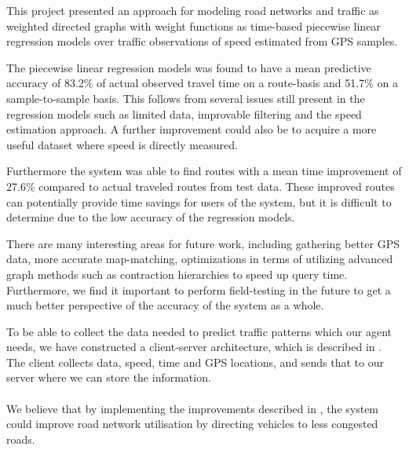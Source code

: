 This project presented an approach for modeling road networks and traffic as weighted directed graphs with weight functions as time-based piecewise linear regression models over traffic observations of speed estimated from GPS samples.

The piecewise linear regression models was found to have a mean predictive accuracy of 83.2\% of actual observed travel time on a route-basis and 51.7\% on a sample-to-sample basis. This follows from several issues still present in the regression models such as limited data, improvable filtering and the speed estimation approach. A further improvement could also be to acquire a more useful dataset where speed is directly measured.

Furthermore the system was able to find routes with a mean time improvement of 27.6\% compared to actual traveled routes from test data. These improved routes can potentially provide time savings for users of the system, but it is difficult to determine due to the low accuracy of the regression models. 

There are many interesting areas for future work, including gathering better GPS data, more accurate map-matching, optimizations in terms of utilizing advanced graph methods such as contraction hierarchies to speed up query time. Furthermore, we find it important to perform field-testing in the future to get a much better perspective of the accuracy of the system as a whole.

To be able to collect the data needed to predict traffic patterns which our agent needs, we have constructed a client-server architecture, which is described in . The client collects data, speed, time and GPS locations, and sends that to our server where we can store the information.
\\\\
We believe that by implementing the improvements described in , the system could improve road network utilisation by directing vehicles to less congested roads. 